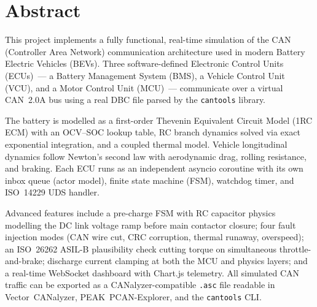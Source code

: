 \documentclass[12pt, a4paper, openany]{report}
\newcommand{\code}[1]{\texttt{#1}}
\begin{document}
\begin{titlepage}
\begin{center}
\end{center}

\vfill

\begin{center}
  \color{white!40}{\small
    Subject: Assignment Submission --- Mohammed Rayan ---
    Real-Time EV CAN Bus Simulation}
\end{center}

\vspace*{0.6cm}
\end{titlepage}

\pagecolor{white}
\color{black}
\setcounter{page}{1}

\chapter*{Abstract}
\thispagestyle{fancy}

This project implements a fully functional, real-time simulation of the CAN
(Controller Area Network) communication architecture used in modern Battery
Electric Vehicles (BEVs). Three software-defined Electronic Control Units
(ECUs)~--- a Battery Management System (BMS), a Vehicle Control Unit (VCU),
and a Motor Control Unit (MCU)~--- communicate over a virtual CAN~2.0A bus
using a real DBC file parsed by the \code{cantools} library.

The battery is modelled as a first-order Thevenin Equivalent Circuit Model
(1RC ECM) with an OCV--SOC lookup table, RC branch dynamics solved via exact
exponential integration, and a coupled thermal model. Vehicle longitudinal
dynamics follow Newton's second law with aerodynamic drag, rolling
resistance, and braking. Each ECU runs as an independent asyncio coroutine
with its own inbox queue (actor model), finite state machine (FSM), watchdog
timer, and ISO~14229 UDS handler.

Advanced features include a pre-charge FSM with RC capacitor physics
modelling the DC link voltage ramp before main contactor closure; four fault
injection modes (CAN wire cut, CRC corruption, thermal runaway, overspeed);
an ISO~26262 ASIL-B plausibility check cutting torque on simultaneous
throttle-and-brake; discharge current clamping at both the MCU and physics
layers; and a real-time WebSocket dashboard with Chart.js telemetry. All
simulated CAN traffic can be exported as a CANalyzer-compatible \code{.asc}
file readable in Vector~CANalyzer, PEAK~PCAN-Explorer, and the \code{cantools}
CLI.
\end{document}
